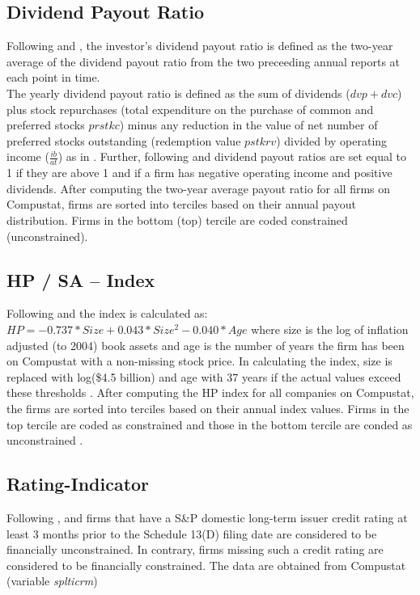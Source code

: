 \documentclass[12pt]{article}
\begin{document}
\begin{appendices}
	\subsection*{Dividend Payout Ratio}
	\noindent Following \citet[p.119]{Khatami2014} and \citet[p.1789]{Almeida2004}, the investor's dividend payout ratio is defined as the two-year average of the dividend payout ratio from the two preceeding annual reports at each point in time.\\
	The yearly dividend payout ratio is defined as the sum of dividends ($dvp+dvc$) plus stock repurchases (total expenditure on the purchase of common and preferred stocks $prstkc$) minus any reduction in the value of net number of preferred stocks outstanding (redemption value $pstkrv$) divided by operating income ($\frac{ib}{at}$) as in \citet[p.369]{Jagannathan2000}. Further, following \citet[p.119]{Khatami2014} and \citet[p.1923]{hadlock2010} dividend payout ratios are set equal to 1 if they are above 1 and if a firm has negative operating income and positive dividends. After computing the two-year average payout ratio for all firms on Compustat, firms are sorted into terciles based on their annual payout distribution. Firms in the bottom (top) tercile are coded constrained (unconstrained). 

	\subsection*{HP / SA -- Index}
	\noindent Following \citet[p.1929]{hadlock2010} and \citet[p.119]{Khatami2014} the index is calculated as: $HP=-0.737*Size+0.043*Size^{2}-0.040*Age$ where size is the log of inflation adjusted (to 2004) book assets and age is the number of years the firm has been on Compustat with a non-missing stock price. In calculating the index, size is replaced with log(\$4.5 billion) and age with 37 years if the actual values exceed these thresholds \citep[p.1929]{hadlock2010}. After computing the HP index for all companies on Compustat, the firms are sorted into terciles based on their annual index values. Firms in the top tercile are coded as constrained and those in the bottom tercile are conded as unconstrained \citep[p.306]{Farre-Mensa2016}.

	\subsection*{Rating-Indicator}
	\noindent Following \citet[p.18]{heller2015}, \citet[p.1790]{Almeida2004} and \citet[p.305]{Farre-Mensa2016} firms that have a S\&P domestic long-term issuer credit rating at least 3 months prior to the Schedule 13(D) filing date are considered to be financially unconstrained. In contrary, firms missing such a credit rating are considered to be financially constrained. The data are obtained from Compustat (variable \emph{splticrm})

\end{appendices}
\end{document}
